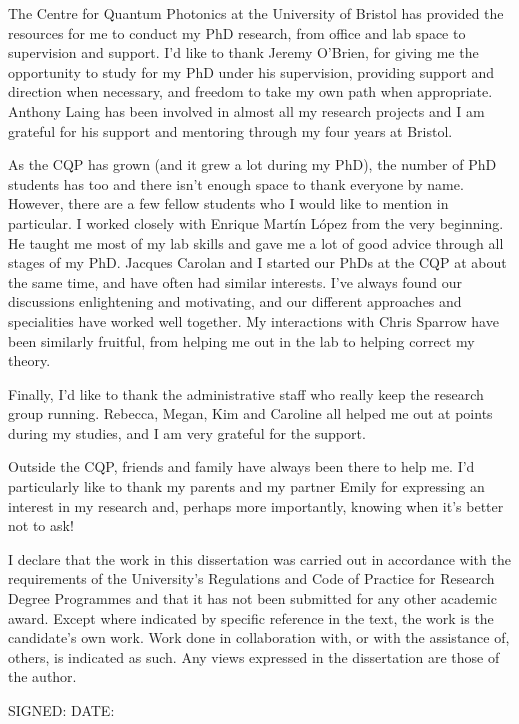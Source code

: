 \begin{acknowledgements}
The Centre for Quantum Photonics at the University of Bristol has provided the
resources for me to conduct my PhD research, from office and lab space to
supervision and support. I'd like to thank Jeremy O'Brien, for giving me the
opportunity to study for my PhD under his supervision, providing support and
direction when necessary, and freedom to take my own path when appropriate.
Anthony Laing has been involved in almost all my research projects and I am
grateful for his support and mentoring through my four years at Bristol.

As the CQP has grown (and it grew a lot during my PhD), the number of PhD
students has too and there isn't enough space to thank everyone by name.
However, there are a few fellow students who I would like to mention in
particular. I worked closely with Enrique Mart\'in L\'opez from the very
beginning. He taught me most of my lab skills and gave me a lot of good advice
through all stages of my PhD. Jacques Carolan and I started our PhDs at the CQP
at about the same time, and have often had similar interests. I've always found
our discussions enlightening and motivating, and our different approaches and
specialities have worked well together. My interactions with Chris Sparrow have
been similarly fruitful, from helping me out in the lab to helping correct my
theory.

Finally, I'd like to thank the administrative staff who really keep the
research group running. Rebecca, Megan, Kim and Caroline all helped me out at
points during my studies, and I am very grateful for the support.

Outside the CQP, friends and family have always been there to help me. I'd
particularly like to thank my parents and my partner Emily for expressing an
interest in my research and, perhaps more importantly, knowing when it's better
not to ask!
\end{acknowledgements}

\begin{declaration}
  I declare that the work in this dissertation was carried out in accordance
  with the requirements of the University's Regulations and Code of Practice for
  Research Degree Programmes and that it has not been submitted for any other
  academic award. Except where indicated by specific reference in the text, the
  work is the candidate's own work. Work done in collaboration with, or with the
  assistance of, others, is indicated as such. Any views expressed in the
  dissertation are those of the author.

  SIGNED: \dotfill DATE: \dotfill
\end{declaration}

\tableofcontents
\listoffigures

